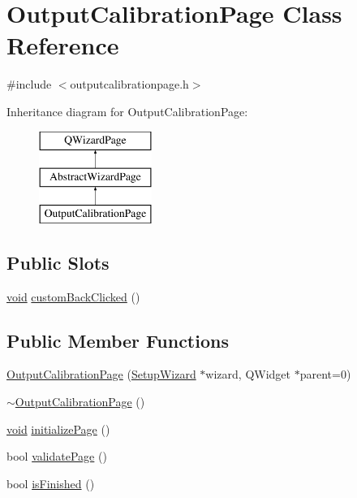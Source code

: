 \hypertarget{class_output_calibration_page}{\section{Output\-Calibration\-Page Class Reference}
\label{class_output_calibration_page}
}


{\ttfamily \#include $<$outputcalibrationpage.\-h$>$}

Inheritance diagram for Output\-Calibration\-Page\-:\begin{figure}[H]
\begin{center}
\leavevmode
\includegraphics[height=3.000000cm]{class_output_calibration_page}
\end{center}
\end{figure}
\subsection*{Public Slots}
\begin{DoxyCompactItemize}
\item 
\hyperlink{group___u_a_v_objects_plugin_ga444cf2ff3f0ecbe028adce838d373f5c}{void} \hyperlink{group___output_calibration_page_ga57d81c161a6f2b1abc782e81a4707fcc}{custom\-Back\-Clicked} ()
\end{DoxyCompactItemize}
\subsection*{Public Member Functions}
\begin{DoxyCompactItemize}
\item 
\hyperlink{group___output_calibration_page_ga4975a50caf4226865af2d1d03e0fe82c}{Output\-Calibration\-Page} (\hyperlink{class_setup_wizard}{Setup\-Wizard} $\ast$wizard, Q\-Widget $\ast$parent=0)
\item 
\hyperlink{group___output_calibration_page_ga4869b75d9c4a4506853c6901d70fa8cd}{$\sim$\-Output\-Calibration\-Page} ()
\item 
\hyperlink{group___u_a_v_objects_plugin_ga444cf2ff3f0ecbe028adce838d373f5c}{void} \hyperlink{group___output_calibration_page_ga24bab144119d2bf977e40d7f33d16121}{initialize\-Page} ()
\item 
bool \hyperlink{group___output_calibration_page_ga3e208c77155e8ab46a19849174aae3b6}{validate\-Page} ()
\item 
bool \hyperlink{group___output_calibration_page_ga05fb534babe43fa9477a9d2ab14f5fbf}{is\-Finished} ()
\end{DoxyCompactItemize}
